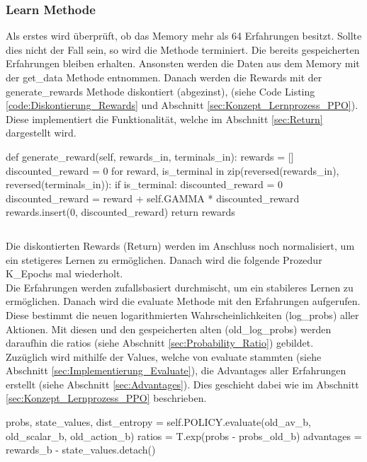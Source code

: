 \subsubsection{Learn Methode} \label{sec:Implementierung_learn_PPO}
Als erstes wird überprüft, ob das Memory mehr als 64 Erfahrungen besitzt. Sollte dies nicht der Fall sein, so wird die Methode terminiert. 
Die bereits gespeicherten Erfahrungen bleiben erhalten.
Ansonsten werden die Daten aus dem Memory mit der get\_data Methode entnommen.
Danach werden die Rewards mit der generate\_rewards Methode diskontiert (abgezinst), (siehe Code Listing \ref{code:Diskontierung_Rewards} und Abschnitt \ref{sec:Konzept_Lernprozess_PPO}). Diese implementiert die Funktionalität, welche im Abschnitt \ref{sec:Return} dargestellt wird.
\begin{python}
def generate_reward(self, rewards_in, terminals_in):
	rewards = []
	discounted_reward = 0
	for reward, is_terminal in zip(reversed(rewards_in), reversed(terminals_in)):
		if is_terminal:
			discounted_reward = 0
		discounted_reward = reward + self.GAMMA * discounted_reward
		rewards.insert(0, discounted_reward)
	return rewards
\end{python}
\begin{lstlisting}[caption=Diskontierung der Rewards, label=code:Diskontierung_Rewards]
\end{lstlisting}
Die diskontierten Rewards (Return) werden im Anschluss noch normalisiert, um ein stetigeres Lernen zu ermöglichen.
Danach wird die folgende Prozedur K\_Epochs mal wiederholt.\\
Die Erfahrungen werden zufallsbasiert durchmischt, um ein stabileres Lernen zu ermöglichen. 
Danach wird die evaluate Methode mit den Erfahrungen aufgerufen. Diese bestimmt die neuen logarithmierten Wahrscheinlichkeiten (log\_probs) aller Aktionen. Mit diesen und den gespeicherten alten (old\_log\_probs) werden daraufhin die ratios (siehe Abschnitt \ref{sec:Probability_Ratio}) gebildet.\\
Zuzüglich wird mithilfe der Values, welche von evaluate stammten (siehe Abschnitt \ref{sec:Implementierung_Evaluate}), die Advantages aller Erfahrungen erstellt (siehe Abschnitt \ref{sec:Advantages}). Dies geschieht dabei wie im Abschnitt \ref{sec:Konzept_Lernprozess_PPO} beschrieben.
\begin{python}		
probs, state_values, dist_entropy = self.POLICY.evaluate(old_av_b, old_scalar_b, old_action_b)	
ratios = T.exp(probs - probs_old_b)	
advantages = rewards_b - state_values.detach()
\end{python}
